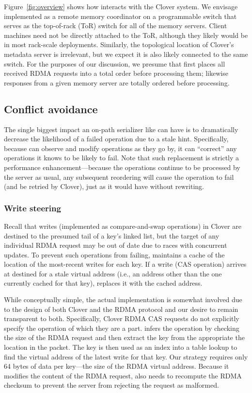 
Figure~\ref{fig:overview} shows how {\sword} interacts with the Clover
system.  We envisage {\sword} implemented as a remote memory coordinator
on a programmable switch that serves as the top-of-rack (ToR) switch
for all of the memory servers.  Client machines need not be directly
attached to the ToR, although they likely would be in most rack-scale
deployments.  Similarly, the topological location of Clover's metadata
server is irrelevant, but we expect it is also likely connected to the
same switch.  For the purposes of our discussion, we presume that
{\sword} first places all received RDMA requests into a total order
before processing them; likewise responses from a given memory
server are totally ordered before processing.

\subsection{Conflict avoidance}

The single biggest impact an on-path serializer like {\sword} can have
is to dramatically decrease the likelihood of a failed operation due
to a stale hint.  Specifically, because {\sword} can observe and
modify operations as they go by, it can ``correct'' any operations it
knows to be likely to fail.  Note that such replacement is strictly a
performance enhancement---because the operations continue to be
processed by the server as usual, any subsequent reordering will
cause the operation to fail (and be retried by Clover), just as
it would have without rewriting.

\subsubsection{Write steering}

Recall that writes (implemented as compare-and-swap operations) in
Clover are destined to the presumed tail of a key's linked list, but
the target of any individual RDMA request may be out of date due to
races with concurrent updates.  To prevent such operations from
failing, {\sword} maintains a cache of the location of the most-recent writes
for each key. If a write (CAS operation) arrives at {\sword}
destined for a stale virtual address (i.e., an address other than the
one currently cached for that key), {\sword} replaces it with
the cached address.

While conceptually simple, the actual implementation is somewhat
involved due to the design of both Clover and the RDMA protocol and
our desire to remain transparent to both.  Specifically, Clover RDMA
CAS requests do not explicitly specify the operation of which they are
a part.  {\sword} infers the operation by checking the size of the RDMA
request and then extract the key from the appropriate the location in
the packet.  The key is then used as an index into a table lookup to
find the virtual address of the latest write for that key.  Our
strategy requires only 64 bytes of data per key---the size of the RDMA
virtual address.  Because it modifies the content of the RDMA request,
{\sword} also needs to recompute the RDMA checksum to prevent the server from
rejecting the request as malformed.

